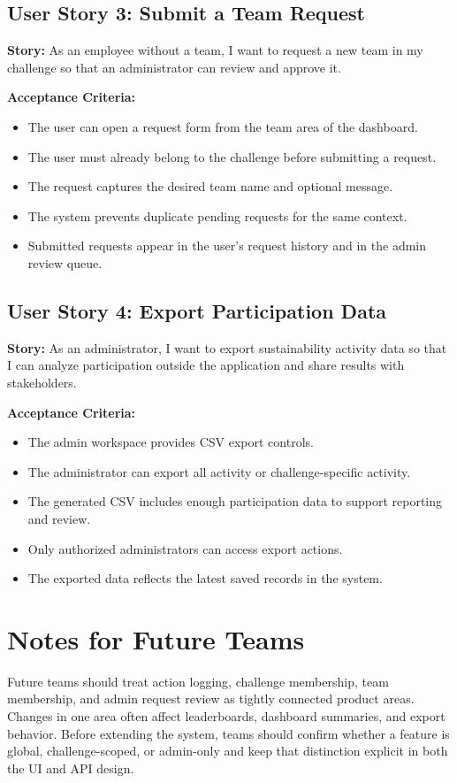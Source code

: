 \documentclass[12pt]{article}
\begin{document}
\subsection{User Story 3: Submit a Team Request}

\textbf{Story:} As an employee without a team, I want to request a new team in
my challenge so that an administrator can review and approve it.

\textbf{Acceptance Criteria:}
\begin{itemize}[leftmargin=1.5em]
    \item The user can open a request form from the team area of the dashboard.
    \item The user must already belong to the challenge before submitting a
    request.
    \item The request captures the desired team name and optional message.
    \item The system prevents duplicate pending requests for the same context.
    \item Submitted requests appear in the user's request history and in the
    admin review queue.
\end{itemize}

\subsection{User Story 4: Export Participation Data}

\textbf{Story:} As an administrator, I want to export sustainability activity
data so that I can analyze participation outside the application and share
results with stakeholders.

\textbf{Acceptance Criteria:}
\begin{itemize}[leftmargin=1.5em]
    \item The admin workspace provides CSV export controls.
    \item The administrator can export all activity or challenge-specific
    activity.
    \item The generated CSV includes enough participation data to support
    reporting and review.
    \item Only authorized administrators can access export actions.
    \item The exported data reflects the latest saved records in the system.
\end{itemize}

\section{Notes for Future Teams}

Future teams should treat action logging, challenge membership, team
membership, and admin request review as tightly connected product areas.
Changes in one area often affect leaderboards, dashboard summaries, and export
behavior. Before extending the system, teams should confirm whether a feature
is global, challenge-scoped, or admin-only and keep that distinction explicit
in both the UI and API design.
\end{document}
